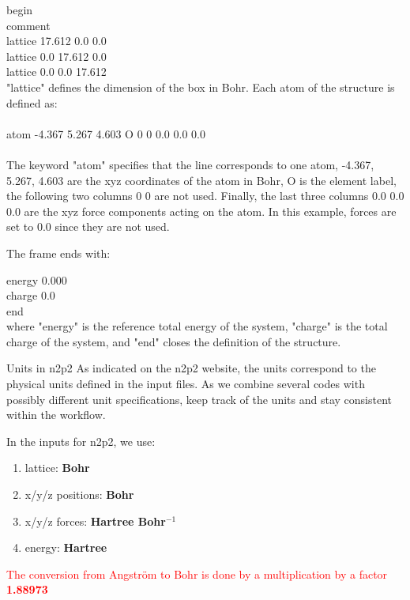 \documentclass[12pt]{article}
\newcommand\Warning{%
 \makebox[1.4em][c]{%
 \makebox[0pt][c]{\raisebox{.1em}{\small!}}%
 \makebox[0pt][c]{\color{red}\Large$\bigtriangleup$}}}%
\begin{document}
 \noindent begin \\
 comment \\
 lattice 17.612 0.0 0.0 \\
 lattice 0.0 17.612 0.0 \\
 lattice 0.0 0.0 17.612 \\

\noindent "lattice" defines the dimension of the box in Bohr.
Each atom of the structure is defined as: \\ \\
 atom \hspace{0.5cm}  -4.367  \hspace{0.5cm}      5.267    \hspace{0.5cm}    4.603  \hspace{0.5cm}    O \hspace{0.5cm} 0 0 \hspace{0.5cm} 0.0 0.0 0.0 \\ \\
The keyword "atom" specifies that the line corresponds to one atom, -4.367, 5.267, 4.603 are the xyz coordinates of the atom in Bohr, O is the element label, the following two columns 0 0 are not used. Finally, the last three columns 0.0 0.0 0.0 are the xyz force components acting on the atom. In this example, forces are set to 0.0 since they are not used.
\vspace{0.5cm}

 \noindent The frame ends with: 
\vspace{0.5cm}

 \noindent energy 0.000 \\
 charge 0.0 \\
 end \\

\noindent where "energy" is the reference total energy of the system, "charge" is the total charge of the system, and "end" closes the definition of the structure. 

\begin{mybox1}{Units in n2p2}
\Warning As indicated on the n2p2 website, the units correspond to the physical units defined in the input files. As we combine several codes with possibly different unit specifications, keep track of the units and stay consistent within the workflow.

In the inputs for n2p2, we use:
\begin{enumerate}
    \item lattice: \textbf{Bohr}
    \item x/y/z positions: \textbf{Bohr}
    \item x/y/z forces: \textbf{Hartree Bohr$^{-1}$}
    \item energy: \textbf{Hartree}
\end{enumerate}

\textcolor{red}{The conversion from Angström to Bohr is done by a multiplication by a factor \textbf{1.88973}}
\end{mybox1}
\end{document}
